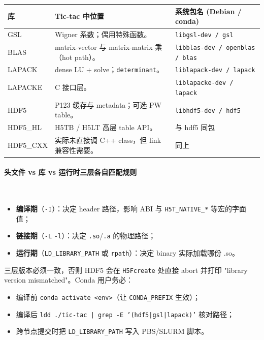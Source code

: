 \begin{center}
\begin{tabular}{l p{6cm} p{5cm}}
\toprule
库 & Tic-tac 中位置 & 系统包名 (Debian / conda) \\
\midrule
GSL          & Wigner 系数；偶用特殊函数。
             & \texttt{libgsl-dev / gsl} \\
BLAS         & matrix-vector 与 matrix-matrix 乘（hot path）。
             & \texttt{libblas-dev / openblas / blas} \\
LAPACK       & dense LU + solve；\texttt{determinant}。
             & \texttt{liblapack-dev / lapack} \\
LAPACKE      & C 接口层。
             & \texttt{liblapacke-dev / lapack} \\
HDF5         & P123 缓存与 metadata；可选 PW table。
             & \texttt{libhdf5-dev / hdf5} \\
HDF5\_HL     & H5TB / H5LT 高层 table API。
             & 与 hdf5 同包 \\
HDF5\_CXX    & 实际未直接调 C++ class，但 link 兼容性需要。
             & 同上 \\
\bottomrule
\end{tabular}
\end{center}

\paragraph{头文件 vs 库 vs 运行时三层各自匹配规则}\

\begin{itemize}
\item \textbf{编译期}（\texttt{-I}）：决定 header 路径，影响 ABI 与
      \texttt{H5T\_NATIVE\_*} 等宏的字面值；
\item \textbf{链接期}（\texttt{-L} \texttt{-l}）：决定 \texttt{.so}/\texttt{.a}
      的物理路径；
\item \textbf{运行期}（\texttt{LD\_LIBRARY\_PATH} 或 \texttt{rpath}）：决定 binary
      实际加载哪份 .so。
\end{itemize}
三层版本必须一致，否则 HDF5 会在 \texttt{H5Fcreate} 处直接 abort 并打印
"library version mismatched"。Conda 用户务必：
\begin{itemize}
\item 编译前 \texttt{conda activate <env>}（让 \texttt{CONDA\_PREFIX} 生效）；
\item 编译后 \texttt{ldd ./tic-tac | grep -E '(hdf5|gsl|lapack)'} 核对路径；
\item 跨节点提交时把 \texttt{LD\_LIBRARY\_PATH} 写入 PBS/SLURM 脚本。
\end{itemize}

